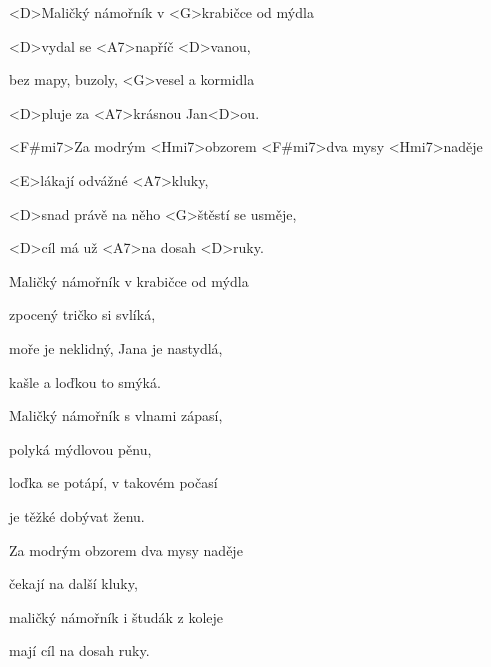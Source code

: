 

\zs
<D>Maličký námořník v <G>krabičce od mýdla

<D>vydal se <A7>napříč <D>vanou,

bez mapy, buzoly, <G>vesel a kormidla

<D>pluje za <A7>krásnou Jan<D>ou.
\ks

\zr
<F#mi7>Za modrým <Hmi7>obzorem
<F#mi7>dva mysy <Hmi7>naděje

<E>lákají odvážné <A7>kluky,

<D>snad právě na něho <G>štěstí se usměje,

<D>cíl má už <A7>na dosah <D>ruky.
\kr

\zs
Maličký námořník v krabičce od mýdla

zpocený tričko si svlíká,

moře je neklidný, Jana je nastydlá,

kašle a loďkou to smýká.
\ks

\zr \kr


\zs
Maličký námořník s vlnami zápasí,

polyká mýdlovou pěnu,

loďka se potápí, v takovém počasí

je těžké dobývat ženu.
\ks

\zr

Za modrým obzorem dva mysy naděje

čekají na další kluky,

maličký námořník i študák z koleje

mají cíl na dosah ruky.
\kr

\kp





